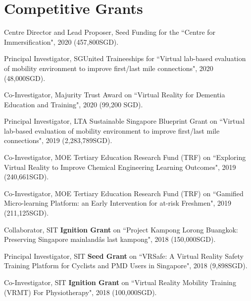 \documentclass[10pt,a4paper]{article}
\renewenvironment{itemize}{
  \begin{list}{}{
    \setlength{\leftmargin}{1.5em}
    \setlength{\itemsep}{0.25em}
    \setlength{\parskip}{0pt}
    \setlength{\parsep}{0.25em}
  }
}{
  \end{list}
}
\begin{document}
\section*{Competitive Grants}

\begin{itemize}

    \item Centre Director and Lead Proposer, Seed Funding for the ``Centre for Immersification", 2020 (457,800SGD).

    \item Principal Investigator, SGUnited Traineeships for ``Virtual lab-based evaluation of mobility environment to improve first/last mile connections", 2020 (48,000SGD).

    \item Co-Investigator, Majurity Trust Award on ``Virtual Reality for Dementia Education and Training", 2020 (99,200 SGD).
        
    \item Principal Investigator, LTA Sustainable Singapore Blueprint Grant on ``Virtual lab-based evaluation of mobility environment to improve first/last mile connections", 2019 (2,283,789SGD).

    \item Co-Investigator, MOE Tertiary Education Research Fund (TRF) on ``Exploring Virtual Reality to Improve Chemical Engineering Learning Outcomes", 2019 (240,661SGD).

    \item Co-Investigator, MOE Tertiary Education Research Fund (TRF) on ``Gamified Micro-learning Platform: an Early Intervention for at-risk Freshmen", 2019 (211,125SGD).

    \item Collaborator, SIT \textbf{Ignition Grant} on ``Project Kampong Lorong Buangkok: Preserving Singapore mainlandâs last kampong", 2018 (150,000SGD).

    \item Principal Investigator, SIT \textbf{Seed Grant} on ``VRSafe: A Virtual Reality Safety Training Platform for Cyclists and PMD Users in Singapore", 2018 (9,898SGD).

    \item Co-Investigator, SIT \textbf{Ignition Grant} on ``Virtual Reality Mobility Training (VRMT) For Physiotherapy", 2018 (100,000SGD).


\end{itemize}
\end{document}
